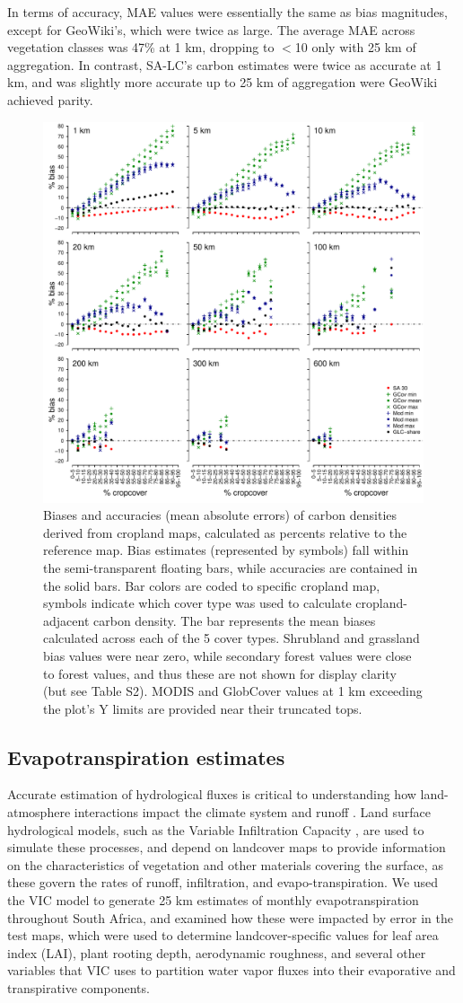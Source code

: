 \documentclass{pnastwo}
\begin{document}
\begin{article}
In terms of accuracy, MAE values were essentially the same as bias magnitudes, except for GeoWiki's, which were twice as large. The average MAE across vegetation classes was 47\% at 1 km, dropping to $<$10 only with 25 km of aggregation. In contrast, SA-LC's carbon estimates were twice as accurate at 1 km, and was slightly more accurate up to 25 km of aggregation were GeoWiki achieved parity.  

\begin{figure}[!h]
\centerline{\includegraphics[width=.5\textwidth]{figures/figure3.pdf}}
\caption{Biases and accuracies (mean absolute errors) of carbon densities derived from cropland maps, calculated as percents relative to the reference map. Bias estimates (represented by symbols) fall within the semi-transparent floating bars, while accuracies are contained in the solid bars. Bar colors are coded to specific cropland map, symbols indicate which cover type was used to calculate cropland-adjacent carbon density. The bar represents the mean biases calculated across each of the 5 cover types. Shrubland and grassland bias values were near zero, while secondary forest values were close to forest values, and thus these are not shown for display clarity (but see Table S2). MODIS and GlobCover values at 1 km exceeding the plot's Y limits are provided near their truncated tops.}
\label{afoto}
\end{figure}

\subsection{Evapotranspiration estimates}
Accurate estimation of hydrological fluxes is critical to understanding how land-atmosphere interactions impact the climate system and runoff \cite{liang_simple_1994}. Land surface hydrological models, such as the Variable Infiltration Capacity \cite{liang_simple_1994}, are used to simulate these processes, and depend on landcover maps to provide information on the characteristics of vegetation and other materials covering the surface, as these govern the rates of runoff, infiltration, and evapo-transpiration. We used the VIC model to generate 25 km estimates of monthly evapotranspiration throughout South Africa, and examined how these were impacted by error in the test maps, which were used to determine landcover-specific values for leaf area index (LAI), plant rooting depth, aerodynamic roughness, and several other variables that VIC uses to partition water vapor fluxes into their evaporative and transpirative components. 


\end{article}
\end{document}
